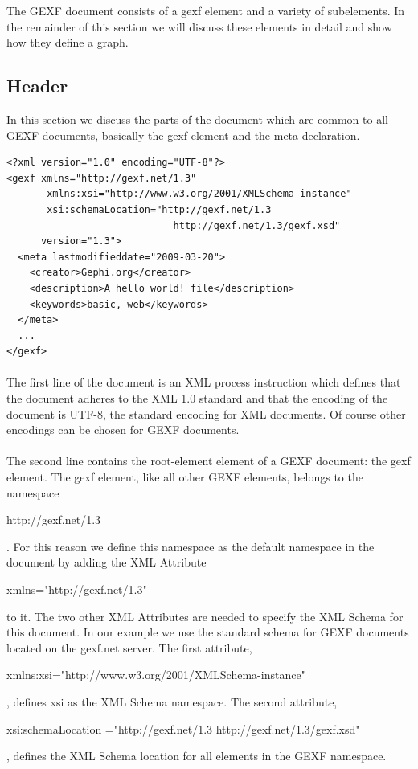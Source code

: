\documentclass[a4paper,10pt]{article}
\begin{document}
The GEXF document consists of a gexf element and a variety of subelements. In the remainder of this section we will discuss these elements in detail and show how they define a graph.

\subsection{Header}

In this section we discuss the parts of the document which are common to all GEXF documents, basically the gexf element and the meta declaration.

\lstset{ style=gexf }
\begin{lstlisting}[caption={Header},label=header]
<?xml version="1.0" encoding="UTF-8"?>
<gexf xmlns="http://gexf.net/1.3"
       xmlns:xsi="http://www.w3.org/2001/XMLSchema-instance"
       xsi:schemaLocation="http://gexf.net/1.3
                             http://gexf.net/1.3/gexf.xsd"
      version="1.3">
  <meta lastmodifieddate="2009-03-20">
    <creator>Gephi.org</creator>
    <description>A hello world! file</description>
    <keywords>basic, web</keywords>
  </meta>
  ...
</gexf>
\end{lstlisting}

\paragraph{}
The first line of the document is an XML process instruction which defines that the document adheres to the XML 1.0 standard and that the encoding of the document is UTF-8, the standard encoding for XML documents. Of course other encodings can be chosen for GEXF documents.

\paragraph{}
The second line contains the root-element element of a GEXF document: the gexf element. The gexf element, like all other GEXF elements, belongs to the namespace \begin{footnotesize}http://gexf.net/1.3\end{footnotesize}. For this reason we define this namespace as the default namespace in the document by adding the XML Attribute \begin{footnotesize}xmlns="http://gexf.net/1.3"\end{footnotesize} to it. The two other XML Attributes are needed to specify the XML Schema for this document. In our example we use the standard schema for GEXF documents located on the gexf.net server. The first attribute, \begin{footnotesize}xmlns:xsi="http://www.w3.org/2001/XMLSchema-instance"\end{footnotesize}, defines xsi as the XML Schema namespace. The second attribute, \begin{footnotesize}xsi:schemaLocation ="http://gexf.net/1.3 http://gexf.net/1.3/gexf.xsd"\end{footnotesize}, defines the XML Schema location for all elements in the GEXF namespace.
\end{document}
